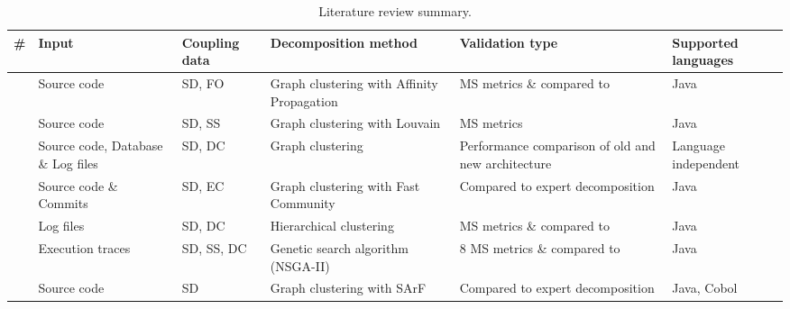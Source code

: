\begin{table}[ht]
    \tiny
    \caption[Literature review summary]{Literature review summary.}\label{tab:summary_papers}
    \begin{tabular}{>{\centering}m{7pt} >{\raggedright}m{55pt} >{\raggedright}m{30pt} >{\raggedright}m{80pt} >{\raggedright}m{80pt} >{\raggedright\arraybackslash}m{40pt}}
        \toprule
        \textbf{\#}
        & \textbf{Input} 
        & \textbf{Coupling data}
        & \textbf{Decomposition method}
        & \textbf{Validation type}
        & \textbf{Supported languages} \\
        \midrule
        \cite{al2021microservice} 
        & Source code
        & SD, FO
        & Graph clustering with Affinity Propagation
        & MS metrics \& compared to \cite{jin2018functionality} \cite{saidani2019towards}
        & Java\\
        \midrule
        \cite{brito2021identification} 
        & Source code
        & SD, SS
        & Graph clustering with Louvain \cite{blondel2008fast}
        & MS metrics
        & Java\\
        \midrule
        \cite{de2018function} 
        & Source code, Database \& Log files
        & SD, DC
        & Graph clustering
        & Performance comparison of old and new architecture
        & Language independent \\
        \midrule
        \cite{eski2018automatic}
        & Source code \& Commits
        & SD, EC
        & Graph clustering with Fast Community \cite{newman2004finding}
        & Compared to expert decomposition
        & Java \\
        \midrule
        \cite{jin2018functionality}
        & Log files
        & SD, DC
        & Hierarchical clustering
        & MS metrics \& compared to \cite{mazlami2017extraction}  \cite{andritsos2005information} \cite{chatterjee2002wca}
        & Java \\
        \midrule
        \cite{jin2019service}
        & Execution traces
        & SD, SS, DC
        & Genetic search algorithm (NSGA-II) \cite{deb2002fast}
        & 8 MS metrics \& compared to \cite{mazlami2017extraction}  \cite{andritsos2005information} \cite{chatterjee2002wca} 
        & Java \\
        \midrule
        \cite{kamimura2018extracting}
        & Source code
        & SD
        & Graph clustering with SArF \cite{kobayashi2012feature}
        & Compared to expert decomposition
        & Java, Cobol \\

\end{tabular}
\end{table}

